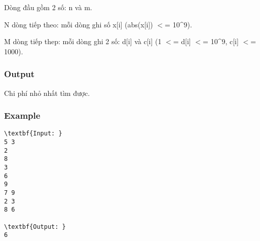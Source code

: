Dòng đầu gồm 2 số: n và m.

N dòng tiếp theo: mỗi dòng ghi số x[i] (abs(x[i]) $<$= 10\textasciicircum9).

M dòng tiếp thep: mỗi dòng ghi 2 số: d[i] và c[i] (1 $<$= d[i] $<$= 10\textasciicircum9, c[i] $<$= 1000).

\subsubsection{\textbf{Output }}

Chi phí nhỏ nhất tìm được.

\subsubsection{Example}
\begin{verbatim}
\textbf{Input: }
5 3
2
8
3
6
9
7 9
2 3
8 6

\textbf{Output: }
6\end{verbatim}